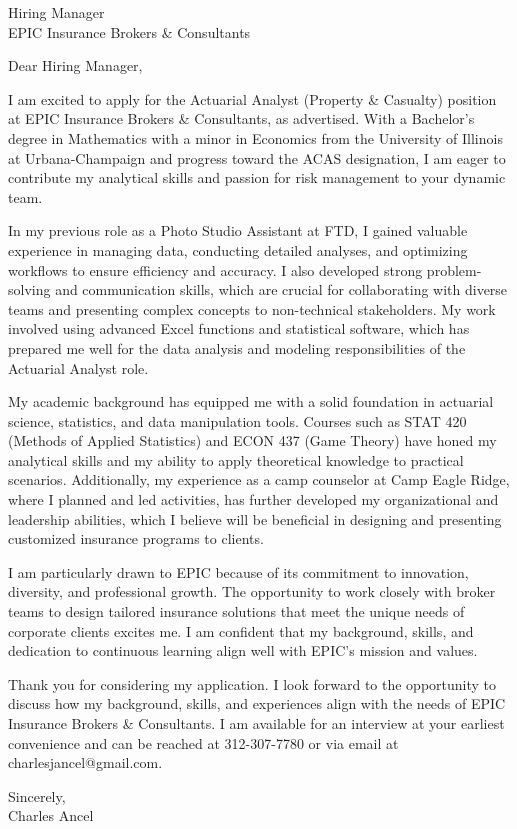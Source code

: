 \documentclass{letter}
\begin{document}
\begin{letter}{Hiring Manager\\EPIC Insurance Brokers \& Consultants}

\opening{Dear Hiring Manager,}

I am excited to apply for the Actuarial Analyst (Property \& Casualty) position at EPIC Insurance Brokers \& Consultants, as advertised. With a Bachelor's degree in Mathematics with a minor in Economics from the University of Illinois at Urbana-Champaign and progress toward the ACAS designation, I am eager to contribute my analytical skills and passion for risk management to your dynamic team.

In my previous role as a Photo Studio Assistant at FTD, I gained valuable experience in managing data, conducting detailed analyses, and optimizing workflows to ensure efficiency and accuracy. I also developed strong problem-solving and communication skills, which are crucial for collaborating with diverse teams and presenting complex concepts to non-technical stakeholders. My work involved using advanced Excel functions and statistical software, which has prepared me well for the data analysis and modeling responsibilities of the Actuarial Analyst role.

My academic background has equipped me with a solid foundation in actuarial science, statistics, and data manipulation tools. Courses such as STAT 420 (Methods of Applied Statistics) and ECON 437 (Game Theory) have honed my analytical skills and my ability to apply theoretical knowledge to practical scenarios. Additionally, my experience as a camp counselor at Camp Eagle Ridge, where I planned and led activities, has further developed my organizational and leadership abilities, which I believe will be beneficial in designing and presenting customized insurance programs to clients.

I am particularly drawn to EPIC because of its commitment to innovation, diversity, and professional growth. The opportunity to work closely with broker teams to design tailored insurance solutions that meet the unique needs of corporate clients excites me. I am confident that my background, skills, and dedication to continuous learning align well with EPIC's mission and values.

Thank you for considering my application. I look forward to the opportunity to discuss how my background, skills, and experiences align with the needs of EPIC Insurance Brokers \& Consultants. I am available for an interview at your earliest convenience and can be reached at 312-307-7780 or via email at charlesjancel@gmail.com.

\begin{flushleft}
Sincerely,\\
Charles Ancel
\end{flushleft}

\end{letter}
\end{document}
